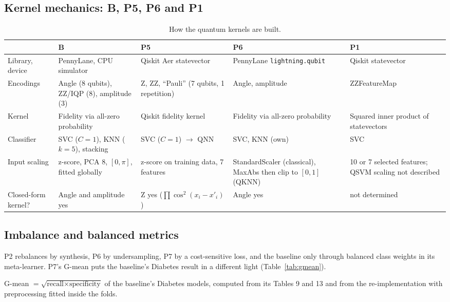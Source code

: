 \documentclass[11pt,a4paper]{article}
\newcommand{\code}[1]{\texttt{\small #1}}
\newcommand{\tabdir}{../reimplementation/tex/papers/}
\begin{document}
\subsection{Kernel mechanics: B, P5, P6 and P1}
\begin{table}[H]
\centering\footnotesize
\caption{How the quantum kernels are built.}
\begin{tabularx}{\textwidth}{l Y Y Y Y}
\toprule
 & B & P5 & P6 & P1 \\
\midrule
Library, device & PennyLane, CPU simulator & Qiskit Aer statevector & PennyLane \code{lightning.qubit} & Qiskit statevector \\
Encodings & Angle (8 qubits), ZZ/IQP (8), amplitude (3) & Z, ZZ, ``Pauli'' (7 qubits, 1 repetition) & Angle, amplitude & ZZFeatureMap \\
Kernel & Fidelity via all-zero probability & Qiskit fidelity kernel & Fidelity via all-zero probability & Squared inner product of statevectors \\
Classifier & SVC ($C=1$), KNN ($k=5$), stacking & SVC ($C=1$) $\to$ QNN & SVC, KNN (own) & SVC \\
Input scaling & z-score, PCA 8, $[0,\pi]$, fitted globally & z-score on training data, 7 features & StandardScaler (classical), MaxAbs then clip to $[0,1]$ (QKNN) & 10 or 7 selected features; QSVM scaling not described \\
Closed-form kernel? & Angle and amplitude yes & Z yes ($\prod\cos^2(x_i-x'_i)$) & Angle yes & not determined \\
\bottomrule
\end{tabularx}
\end{table}

\subsection{Imbalance and balanced metrics}
P2 rebalances by synthesis, P6 by undersampling, P7 by a cost-sensitive loss, and the baseline only through balanced class weights in its meta-learner. P7's G-mean puts the baseline's Diabetes result in a different light (Table~\ref{tab:gmean}).

\begin{table}[H]
\centering\footnotesize
\caption{G-mean $=\sqrt{\text{recall}\times\text{specificity}}$ of the baseline's Diabetes models, computed from its Tables 9 and 13 and from the re-implementation with preprocessing fitted inside the folds.}
\label{tab:gmean}
\begin{adjustbox}{max width=\textwidth}

\end{adjustbox}
\end{table}
\end{document}
